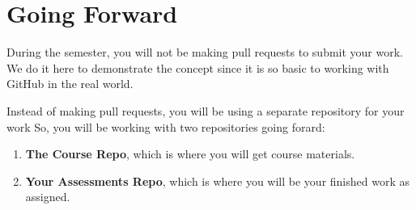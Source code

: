 \documentclass[
  letterpaper,
  DIV=11,
  numbers=noendperiod]{scrreport}
\providecommand{\tightlist}{%
  \setlength{\itemsep}{0pt}\setlength{\parskip}{0pt}}\usepackage{longtable,booktabs,array}
\begin{document}
\hypertarget{going-forward}{%
\section{Going Forward}\label{going-forward}}

During the semester, you will not be making pull requests to submit your
work. We do it here to demonstrate the concept since it is so basic to
working with GitHub in the real world.

Instead of making pull requests, you will be using a separate repository
for your work So, you will be working with two repositories going
forard:

\begin{enumerate}
\def\labelenumi{\arabic{enumi}.}
\tightlist
\item
  \textbf{The Course Repo}, which is where you will get course
  materials.
\item
  \textbf{Your Assessments Repo}, which is where you will be your
  finished work as assigned.
\end{enumerate}
\end{document}
